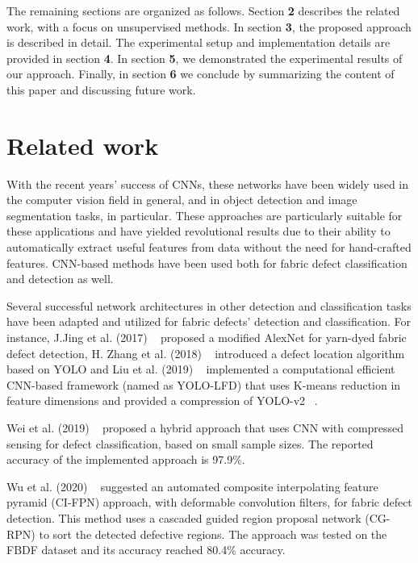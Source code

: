\documentclass[3p,,preprint,review,12pt]{elsarticle}
\begin{document}
The remaining sections are organized as follows. Section \textbf{2} describes the related work, with a focus on unsupervised methods. In section \textbf{3}, the proposed approach is described in detail. The experimental setup and implementation details are provided in section \textbf{4}. In section \textbf{5}, we demonstrated the experimental results of our approach. Finally, in section \textbf{6} we conclude by summarizing the content of this paper and discussing future work.

    
\section{Related work}

With the recent years’ success of CNNs, these networks have been widely used in the computer vision field in general, and in object detection and image segmentation tasks, in particular. These approaches are particularly suitable for these applications and have yielded revolutional results due to their ability to automatically extract useful features from data without the need for hand-crafted features. CNN-based methods have been used both for fabric defect classification and detection as well. 

Several successful network architectures in other detection and classification tasks have been adapted and utilized for fabric defects’ detection and classification.  
For instance, J.Jing et al. (2017) \unskip~\cite{Jing2017YarndyedFD} proposed a modified AlexNet for yarn-dyed fabric defect detection, H. Zhang et al. (2018) \unskip~\cite{Zhang2018YarndyedFD} introduced a defect location algorithm based on YOLO and Liu et al. (2019) \unskip~\cite{Liu2019FabricDD} implemented a computational efficient CNN-based framework (named as YOLO-LFD) that uses K-means reduction in feature dimensions and provided a compression of YOLO-v2 \unskip~\cite{Redmon2017YOLO9000BF}.

Wei et al. (2019) \unskip~\cite{Wei2019ANM} proposed a hybrid approach that uses CNN with compressed sensing  for defect classification, based on small sample sizes. The reported accuracy of the implemented approach is 97.9\%.

Wu et al. (2020) \unskip~\cite{Wu2020AutomaticFD} suggested an automated composite interpolating feature pyramid (CI-FPN) approach, with deformable convolution filters, for fabric defect detection. This method uses a cascaded guided region proposal network (CG-RPN) to sort the detected defective regions. The approach was tested on the FBDF dataset and its accuracy reached 80.4\% accuracy.
\end{document}
